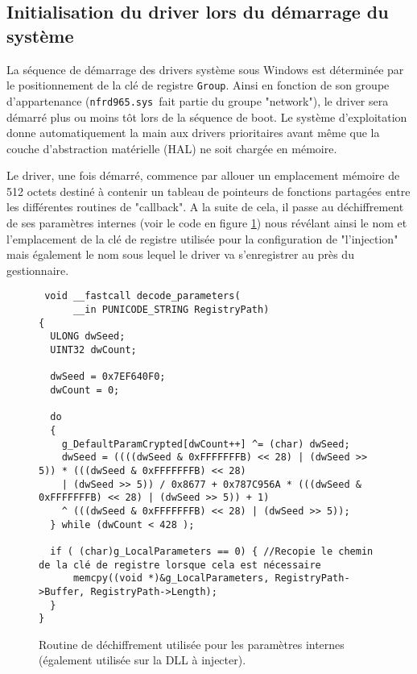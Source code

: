 \documentclass[times,11pt,fullpage]{article}
\newcommand{\driver}{\texttt{nfrd965.sys}}
\begin{document}
\subsection{Initialisation du driver lors du démarrage du système}
La séquence de démarrage des drivers système sous Windows est déterminée par le positionnement de la clé de registre \texttt{Group}. Ainsi en fonction de son groupe d'appartenance (\driver\ fait partie du groupe "network"), le driver sera démarré plus ou moins tôt lors de la séquence de boot. Le système d'exploitation donne automatiquement la main aux drivers prioritaires avant même que la couche d'abstraction matérielle (HAL) ne soit chargée en mémoire. 

Le driver, une fois démarré, commence par allouer un emplacement mémoire de 512 octets destiné à contenir un tableau de pointeurs de fonctions partagées entre les différentes routines de "callback". A la suite de cela, il passe au déchiffrement de ses paramètres internes (voir le code en figure \ref{fig:decrypt}) nous révélant ainsi le nom et l'emplacement de la clé de registre utilisée pour la configuration de "l'injection" mais également le nom sous lequel le driver va s'enregistrer au près du gestionnaire.  
\begin{figure}
\scriptsize
\begin{framed}
\begin{verbatim}
 void __fastcall decode_parameters(
      __in PUNICODE_STRING RegistryPath)
{
  ULONG dwSeed; 
  UINT32 dwCount; 

  dwSeed = 0x7EF640F0;
  dwCount = 0;
  
  do
  {
    g_DefaultParamCrypted[dwCount++] ^= (char) dwSeed;
    dwSeed = ((((dwSeed & 0xFFFFFFFB) << 28) | (dwSeed >> 5)) * (((dwSeed & 0xFFFFFFFB) << 28) 
    | (dwSeed >> 5)) / 0x8677 + 0x787C956A * (((dwSeed & 0xFFFFFFFB) << 28) | (dwSeed >> 5)) + 1) 
    ^ (((dwSeed & 0xFFFFFFFB) << 28) | (dwSeed >> 5));
  } while (dwCount < 428 );

  if ( (char)g_LocalParameters == 0) { //Recopie le chemin de la clé de registre lorsque cela est nécessaire
      memcpy((void *)&g_LocalParameters, RegistryPath->Buffer, RegistryPath->Length);
  }
}
\end{verbatim}
\end{framed}
\caption{Routine de déchiffrement utilisée pour les paramètres internes (également utilisée sur la DLL à injecter).\label{fig:decrypt}}
\end{figure}
  
\end{document}

